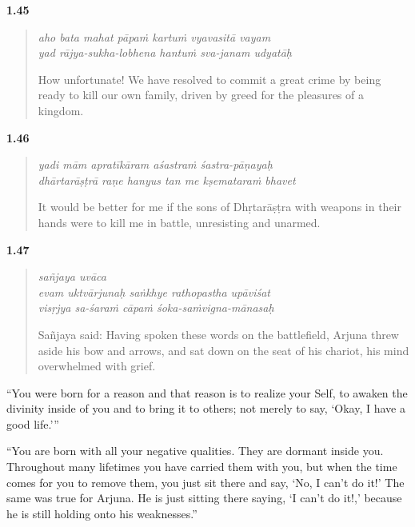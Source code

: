 \par\noindent\textbf{1.45}\par
\begin{verse}
\textit{aho bata mahat pāpaṁ kartuṁ vyavasitā vayam} \\
\textit{yad rājya-sukha-lobhena hantuṁ sva-janam udyatāḥ}

\noindent How unfortunate! We have resolved to commit a great crime by being ready to kill our own family, driven by greed for the pleasures of a kingdom.
\end{verse}
\par



\par\noindent\textbf{1.46}\par
\begin{verse}
\textit{yadi mām apratīkāram aśastraṁ śastra-pāṇayaḥ} \\
\textit{dhārtarāṣṭrā raṇe hanyus tan me kṣemataraṁ bhavet}

\noindent It would be better for me if the sons of Dhṛtarāṣṭra with weapons in their hands were to kill me in battle, unresisting and unarmed.
\end{verse}
\par




\par\noindent\textbf{1.47}\par
\begin{verse}
\textit{sañjaya uvāca} \\
\textit{evam uktvārjunaḥ saṅkhye rathopastha upāviśat} \\
\textit{visṛjya sa-śaraṁ cāpaṁ śoka-saṁvigna-mānasaḥ}

\noindent Sañjaya said: Having spoken these words on the battlefield, Arjuna threw aside his bow and arrows, and sat down on the seat of his chariot, his mind overwhelmed with grief.
\end{verse}
\par


\enquote{You were born for a reason and that reason is to realize your Self, to awaken the divinity inside of you and to bring it to others; not merely to say, \enquote{Okay, I have a good life.}}

\enquote{You are born with all your negative qualities. They are dormant inside you. Throughout many lifetimes you have carried them with you, but when the time comes for you to remove them, you just sit there and say, \enquote{No, I can’t do it!} The same was true for Arjuna. He is just sitting there saying, \enquote{I can’t do it!,} because he is still holding onto his weaknesses.}


